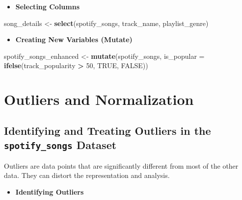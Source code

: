 \documentclass[
  b5paper]{book}
\newenvironment{Shaded}{\begin{snugshade}}{\end{snugshade}}
\newcommand{\AttributeTok}[1]{\textcolor[rgb]{0.13,0.29,0.53}{#1}}
\newcommand{\ConstantTok}[1]{\textcolor[rgb]{0.56,0.35,0.01}{#1}}
\newcommand{\DecValTok}[1]{\textcolor[rgb]{0.00,0.00,0.81}{#1}}
\newcommand{\FunctionTok}[1]{\textcolor[rgb]{0.13,0.29,0.53}{\textbf{#1}}}
\newcommand{\NormalTok}[1]{#1}
\newcommand{\OtherTok}[1]{\textcolor[rgb]{0.56,0.35,0.01}{#1}}
\newcommand{\SpecialCharTok}[1]{\textcolor[rgb]{0.81,0.36,0.00}{\textbf{#1}}}
\providecommand{\tightlist}{%
  \setlength{\itemsep}{0pt}\setlength{\parskip}{0pt}}
\begin{document}
\begin{itemize}
\tightlist
\item
  \textbf{Selecting Columns}
\end{itemize}

\begin{Shaded}
\begin{Highlighting}[]
\NormalTok{song\_details }\OtherTok{\textless{}{-}} \FunctionTok{select}\NormalTok{(spotify\_songs, track\_name, playlist\_genre)}
\end{Highlighting}
\end{Shaded}

\begin{itemize}
\tightlist
\item
  \textbf{Creating New Variables (Mutate)}
\end{itemize}

\begin{Shaded}
\begin{Highlighting}[]
\NormalTok{spotify\_songs\_enhanced }\OtherTok{\textless{}{-}} \FunctionTok{mutate}\NormalTok{(spotify\_songs, }\AttributeTok{is\_popular =} \FunctionTok{ifelse}\NormalTok{(track\_popularity }\SpecialCharTok{\textgreater{}} \DecValTok{50}\NormalTok{, }\ConstantTok{TRUE}\NormalTok{, }\ConstantTok{FALSE}\NormalTok{))}
\end{Highlighting}
\end{Shaded}

\hypertarget{outliers-and-normalization}{%
\section{Outliers and Normalization}\label{outliers-and-normalization}}

\hypertarget{identifying-and-treating-outliers-in-the-spotify_songs-dataset}{%
\subsection{\texorpdfstring{Identifying and Treating Outliers in the \texttt{spotify\_songs} Dataset}{Identifying and Treating Outliers in the spotify\_songs Dataset}}\label{identifying-and-treating-outliers-in-the-spotify_songs-dataset}}

Outliers are data points that are significantly different from most of the other data. They can distort the representation and analysis.

\begin{itemize}
\tightlist
\item
  \textbf{Identifying Outliers}
\end{itemize}
\end{document}

